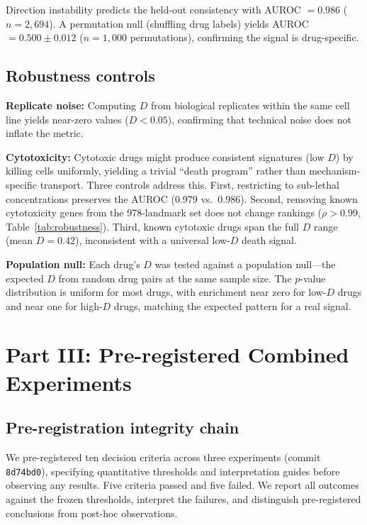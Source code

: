 \documentclass[11pt]{article}
\begin{document}
Direction instability predicts the held-out consistency with AUROC $=
0.986$ ($n = 2{,}694$). A permutation null (shuffling drug labels)
yields AUROC $= 0.500 \pm 0.012$ ($n = 1{,}000$ permutations),
confirming the signal is drug-specific.

\subsection{Robustness controls}

\textbf{Replicate noise:} Computing $D$ from biological replicates
within the same cell line yields near-zero values ($D < 0.05$),
confirming that technical noise does not inflate the metric.

\textbf{Cytotoxicity:} Cytotoxic drugs might produce consistent
signatures (low $D$) by killing cells uniformly, yielding a trivial
``death program'' rather than mechanism-specific transport. Three
controls address this. First, restricting to sub-lethal concentrations
preserves the AUROC (0.979 vs.\ 0.986). Second, removing known
cytotoxicity genes from the 978-landmark set does not change rankings
($\rho > 0.99$, Table~\ref{tab:robustness}). Third, known cytotoxic
drugs span the full $D$ range (mean $D = 0.42$), inconsistent with a
universal low-$D$ death signal.

\textbf{Population null:} Each drug's $D$ was tested against a
population null---the expected $D$ from random drug pairs at the same
sample size. The $p$-value distribution is uniform for most drugs, with
enrichment near zero for low-$D$ drugs and near one for high-$D$ drugs,
matching the expected pattern for a real signal.


\section{Part III: Pre-registered Combined Experiments}

\subsection{Pre-registration integrity chain}

We pre-registered ten decision criteria across three experiments (commit
\texttt{8d74bd0}), specifying quantitative thresholds and interpretation
guides before observing any results. Five criteria passed and five
failed. We report all outcomes against the frozen thresholds, interpret
the failures, and distinguish pre-registered conclusions from post-hoc
observations.
\end{document}

